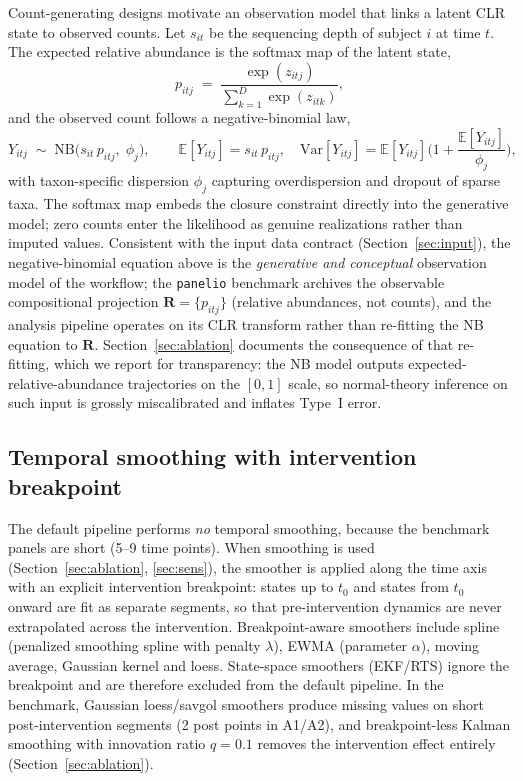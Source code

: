 \documentclass[11pt]{article}
\begin{document}
Count-generating designs motivate an observation model that links a latent CLR state to observed
counts. Let $s_{it}$ be the sequencing depth of subject $i$ at time $t$. The expected relative
abundance is the softmax map of the latent state,
\begin{equation}\label{eq:softmax}
p_{itj} \;=\; \frac{\exp(z_{itj})}{\sum_{k=1}^{D}\exp(z_{itk})},
\end{equation}
and the observed count follows a negative-binomial law,
\begin{equation}\label{eq:nb}
Y_{itj} \;\sim\; \mathrm{NB}\!\big(s_{it}\, p_{itj},\; \phi_j\big),
\qquad
\mathbb{E}[Y_{itj}] = s_{it}\,p_{itj},\quad
\mathrm{Var}[Y_{itj}] = \mathbb{E}[Y_{itj}]\Big(1+\frac{\mathbb{E}[Y_{itj}]}{\phi_j}\Big),
\end{equation}
with taxon-specific dispersion $\phi_j$ capturing overdispersion and dropout of sparse taxa. The
softmax map embeds the closure constraint directly into the generative model; zero counts enter the
likelihood as genuine realizations rather than imputed values. Consistent with the input data contract
(Section~\ref{sec:input}), the negative-binomial equation above is the \emph{generative and
conceptual} observation model of the workflow; the \texttt{panelio} benchmark archives the
observable compositional projection $\mathbf{R}=\{p_{itj}\}$ (relative abundances, not counts), and
the analysis pipeline operates on its CLR transform rather than re-fitting the NB equation to
$\mathbf{R}$. Section~\ref{sec:ablation} documents the consequence of that re-fitting, which we
report for transparency: the NB model outputs expected-relative-abundance trajectories on the
$[0,1]$ scale, so normal-theory inference on such input is grossly miscalibrated and inflates
Type~I error.

\subsection{Temporal smoothing with intervention breakpoint}\label{sec:smooth}

The default pipeline performs \emph{no} temporal smoothing, because the benchmark panels are short
(5--9 time points). When smoothing is used (Section~\ref{sec:ablation}, \ref{sec:sens}), the
smoother is applied along the time axis with an explicit intervention breakpoint: states up to $t_0$
and states from $t_0$ onward are fit as separate segments, so that pre-intervention dynamics are
never extrapolated across the intervention. Breakpoint-aware smoothers include spline
(penalized smoothing spline with penalty $\lambda$), EWMA (parameter $\alpha$), moving average,
Gaussian kernel and loess. State-space smoothers (EKF/RTS) ignore the breakpoint and are therefore
excluded from the default pipeline. In the benchmark, Gaussian loess/savgol smoothers produce
missing values on short post-intervention segments (2 post points in A1/A2), and breakpoint-less
Kalman smoothing with innovation ratio $q=0.1$ removes the intervention effect entirely
(Section~\ref{sec:ablation}).
\end{document}
